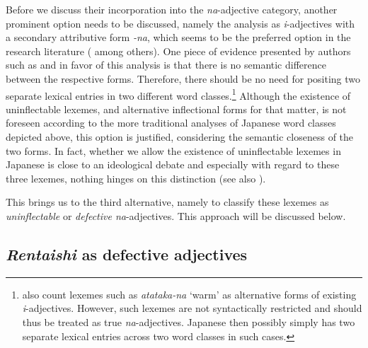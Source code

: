 \documentclass[output=paper,colorlinks,citecolor=brown]{langscibook}
\begin{document}
Before we discuss their incorporation into the \emph{na}-adjective category, another prominent option needs to be discussed, namely the analysis as \emph{i}-adjectives with a secondary attributive form \emph{-na}, which seems to be the preferred option in the research literature (\citealt{suzuki1972, rickmeyer1995, muraki2012, lehmannnishina2015} among others). One piece of evidence presented by authors such as \citet{suzuki1972} and \citet{lehmannnishina2015} in favor of this analysis is that there is no semantic difference between the respective forms. Therefore, there should be no need for positing two separate lexical entries in two different word classes.\footnote{\citet{lehmannnishina2015} also count lexemes such as \emph{atataka-na} `warm' as alternative forms of existing \emph{i}-adjectives. However, such lexemes are not syntactically restricted and should thus be treated as true \emph{na}-adjectives. Japanese then possibly simply has two separate lexical entries across two word classes in such cases.} Although the existence of uninflectable lexemes, and alternative inflectional forms for that matter, is not foreseen according to the more traditional analyses of Japanese word classes depicted above, this option is justified, considering the semantic closeness of the two forms. In fact, whether we allow the existence of uninflectable lexemes in Japanese is close to an ideological debate and especially with regard to these three lexemes, nothing hinges on this distinction (see also \citealt[Fn. 15]{oshimahayashi2021-nihongo}).

This brings us to the third alternative, namely to classify these lexemes as \emph{uninflectable} or \emph{defective na}-adjectives. This approach will be discussed below.

\subsection{\emph{Rentaishi} as defective adjectives} \label{12sec5.2}
\end{document}
